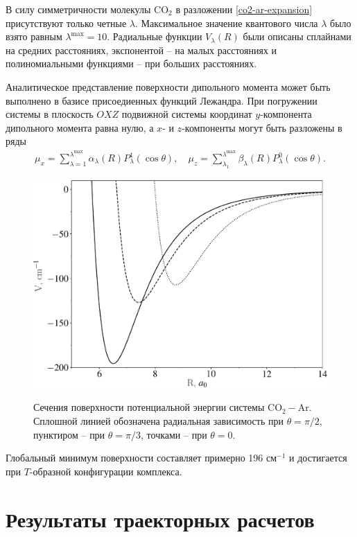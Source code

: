 В силу симметричности молекулы CO$_2$ в разложении \eqref{co2-ar-expansion} присутствуют только четные $\lambda$. Максимальное значение квантового числа $\lambda$ было взято равным $\lambda^\text{max} = 10$. Радиальные функции $V_\lambda(R)$ были описаны сплайнами на средних расстояниях, экспонентой -- на малых расстояниях и полиномиальными функциями -- при больших расстояниях. \par
Аналитическое представление поверхности дипольного момента может быть выполнено в базисе присоедиенных функций Лежандра. При погружении системы в плоскость $OXZ$ подвижной системы координат $y$-компонента дипольного момента равна нулю, а $x$- и $z$-компоненты могут быть разложены в ряды \cite{meyer1986_h2he}
\begin{gather}
    \mu_x = \sum_{\lambda = 1}^{\lambda^\text{max}} \alpha_\lambda(R) P_\lambda^1(\cos \theta), \quad \mu_z = \sum_{\lambda_1}^{\lambda^\text{max}} \beta_\lambda(R) P_\lambda^0(\cos \theta).
\end{gather}

\begin{figure}[H]
    \centering
    \includegraphics[width = 0.75\linewidth]{./pictures/co2-ar-potential-crop.pdf}
    \label{fig:co2-ar-potential}
    \caption{Сечения поверхности потенциальной энергии системы CO$_2-$Ar. Сплошной линией обозначена радиальная зависимость при $\theta = \pi/2$, пунктиром -- при $\theta = \pi/3$, точками -- при $\theta = 0$.}
\end{figure}

Глобальный минимум поверхности составляет примерно 196 см$^{-1}$ и достигается при $T$-образной конфигурации комплекса.

\section{Результаты траекторных расчетов}

